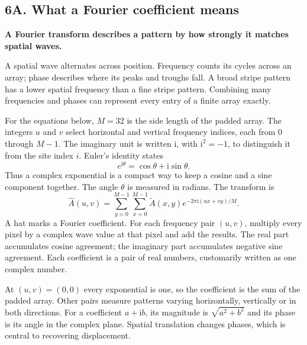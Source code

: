 \documentclass[11pt,letterpaper]{article}
\begin{document}
\clearpage
\subsection*{6A. What a Fourier coefficient means}
\textbf{A Fourier transform describes a pattern by how strongly it matches spatial waves.}

A spatial wave alternates across position. Frequency counts its cycles across an array; phase describes where its peaks and troughs fall. A broad stripe pattern has a lower spatial frequency than a fine stripe pattern. Combining many frequencies and phases can represent every entry of a finite array exactly.

For the equations below, $M=32$ is the side length of the padded array. The integers $u$ and $v$ select horizontal and vertical frequency indices, each from $0$ through $M-1$. The imaginary unit is written $\mathrm{i}$, with $\mathrm{i}^2=-1$, to distinguish it from the site index $i$. Euler's identity states
\[
e^{\mathrm{i}\theta}=\cos\theta+\mathrm{i}\sin\theta.
\]
Thus a complex exponential is a compact way to keep a cosine and a sine component together. The angle $\theta$ is measured in radians. The transform is
\begin{equation}
\widehat A(u,v)=\sum_{y=0}^{M-1}\sum_{x=0}^{M-1}
\widetilde A(x,y)e^{-2\pi\mathrm{i}(ux+vy)/M}.
\end{equation}
A hat marks a Fourier coefficient. For each frequency pair $(u,v)$, multiply every pixel by a complex wave value at that pixel and add the results. The real part accumulates cosine agreement; the imaginary part accumulates negative sine agreement. Each coefficient is a pair of real numbers, customarily written as one complex number.

\begin{center}\end{center}

At $(u,v)=(0,0)$ every exponential is one, so the coefficient is the sum of the padded array. Other pairs measure patterns varying horizontally, vertically or in both directions. For a coefficient $a+\mathrm{i}b$, its magnitude is $\sqrt{a^2+b^2}$ and its phase is its angle in the complex plane. Spatial translation changes phases, which is central to recovering displacement.
\end{document}

